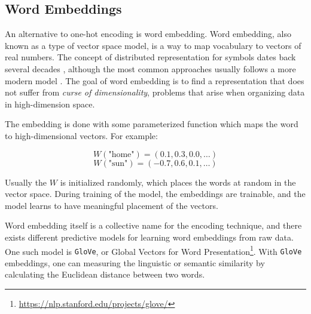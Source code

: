 \subsection{Word Embeddings}
An alternative to one-hot encoding is word embedding. Word embedding, also known as a type of vector space model, is a way to map vocabulary to vectors of real numbers. The concept of distributed representation for symbols dates back several decades \citep{hinton1986learning}, although the most common approaches usually follows a more modern model \citep{bengio2003neural}. The goal of word embedding is to find a representation that does not suffer from \emph{curse of dimensionality}, problems that arise when organizing data in high-dimension space. 

The embedding is done with some parameterized function which maps the word to high-dimensional vectors. For example:

\begin{equation*}
    W(\text{"home"}) = (0.1, 0.3, 0.0, \ldots)
\end{equation*}
\begin{equation*}
    W(\text{"sun"}) = (-0.7, 0.6, 0.1, \ldots)
\end{equation*}

Usually the \(W\) is initialized randomly, which places the words at random in the vector space. During training of the model, the embeddings are trainable, and the model learns to have meaningful placement of the vectors.

Word embedding itself is a collective name for the encoding technique, and there exists different predictive models for learning word embeddings from raw data. One such model is {\tt GloVe}, or Global Vectors for Word Presentation\footnote{\url{https://nlp.stanford.edu/projects/glove/}}. With {\tt GloVe} embeddings, one can measuring the linguistic or semantic similarity by calculating the Euclidean distance between two words.